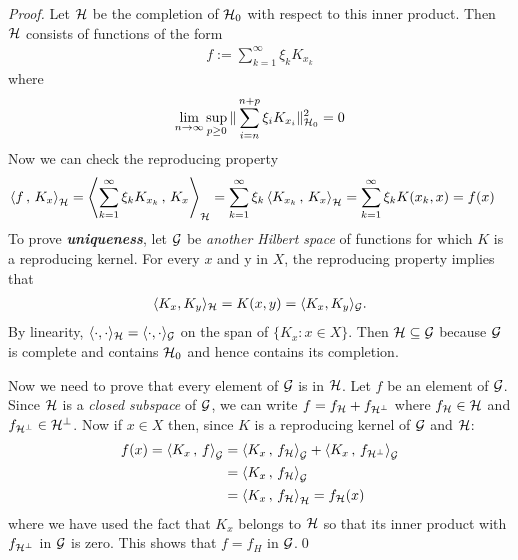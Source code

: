 \documentclass[11pt]{article}
\begin{document}
\begin{itemize}
\begin{proof}
Let ${\mathcal H}$ be the completion of ${\mathcal H}_0$ with respect to this inner product. Then ${\mathcal H}$ consists of functions of the form
\begin{align*}
f:= \sum_{k=1}^{\infty}\xi_{k}K_{x_{k}}
\end{align*} where 
\begin{align*}
\lim\limits_{n\rightarrow \infty}\sup_{p \ge 0}\|\sum_{i=n}^{n+p}\xi_{i}K_{x_{i}}\|_{{\mathcal H}_0}^2 = 0
\end{align*}
Now we can check the reproducing property
\begin{align*}
\left\langle f\,,\, K_x \right\rangle_{{\mathcal H}} &= \left\langle \sum_{k=1}^{\infty}\xi_{k}K_{x_{k}}\,,\, K_x \right\rangle_{{\mathcal H}} = \sum_{k=1}^{\infty}\xi_{k}\left\langle K_{x_k}\,,\, K_x \right\rangle_{{\mathcal H}} = \sum_{k=1}^{\infty}\xi_{k}K(x_k, x) = f(x)
\end{align*}
To prove \emph{\textbf{uniqueness}}, let ${\mathcal G}$ be \emph{another Hilbert space} of functions for which $K$ is a reproducing kernel. For every $x$ and y in $X$, the reproducing property implies that
\begin{align*}
\langle K_{x},K_{y}\rangle _{{\mathcal H}}= K(x,y) = \langle K_{x},K_{y}\rangle_{{\mathcal G}}.
\end{align*}
By linearity,  $\langle \cdot ,\cdot \rangle _{{\mathcal H}}=\langle \cdot ,\cdot \rangle _{{\mathcal G}}$ on the span of $\{K_{x}: x\in X\}$. Then ${\mathcal H}\subseteq {\mathcal G}$ because ${\mathcal G}$ is complete and contains ${\mathcal H}_0$ and hence contains its completion.

Now we need to prove that every element of ${\mathcal G}$ is in ${\mathcal H}$. Let $f$ be an element of ${\mathcal G}$. Since ${\mathcal H}$ is a \emph{closed subspace} of ${\mathcal G}$, we can write $f=f_{{\mathcal H}}+f_{{\mathcal H}^{\bot }}$ where  $f_{{\mathcal H}}\in {\mathcal H}$ and $f_{{\mathcal H}^{\bot }}\in {\mathcal H}^{\bot }$. Now if $x\in X$ then, since $K$ is a reproducing kernel of ${\mathcal G}$ and ${\mathcal H}$:
\begin{align*}
f(x)=\left\langle K_{x}\,,\, f \right\rangle_{{\mathcal G}} &=\left\langle K_{x}\,,\, f_{{\mathcal H}} \right\rangle_{{\mathcal G}}+\left\langle K_{x}\,,\, f_{{\mathcal H}^{\bot }} \right\rangle_{{\mathcal G}} \\
&=\left\langle K_{x}\,,\, f_{{\mathcal H}} \right\rangle_{{\mathcal G}} \\
&=\left\langle K_{x}\,,\, f_{{\mathcal H}} \right\rangle_{{\mathcal H}} = f_{{\mathcal H}}(x)
\end{align*} where we have used the fact that $K_{x}$  belongs to ${\mathcal H}$ so that its inner product with $f_{{\mathcal H}^{\bot }}$ in ${\mathcal G}$ is zero. This shows that $f=f_{H}$ in ${\mathcal G}$.\qed
\end{proof}
\end{itemize}

\end{document}
